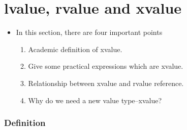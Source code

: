 \documentclass[a4paper,12pt,twoside]{book}
\begin{document}
\section{lvalue, rvalue and xvalue}
\begin{itemize}
	\item In this section, there are four important points
	\begin{enumerate}
		\item Academic definition of xvalue.
		\item Give some practical expressions which are xvalue.
		\item Relationship between xvalue and rvalue reference.
		\item Why do we need a new value type--xvalue?
	\end{enumerate}
	
\end{itemize}

\subsubsection{Definition}
\end{document}
